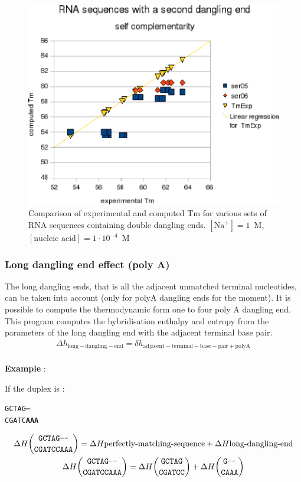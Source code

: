 \documentclass{article}
\begin{document}
\begin{figure}[h]
\includegraphics{images/RNASecondDanglingEnd.eps}
\caption{Comparison of experimental and computed Tm for various sets of
 RNA sequences containing double dangling ends. $[\mbox{Na}^+] = 1$~M, $[\mbox{nucleic acid}] = 1\cdot{}10^{-4}$~M}
\end{figure}

\subsubsection{Long dangling end effect (poly A)}

The long dangling ends, that is all the adjacent unmatched terminal nucleotides, can be taken into
account (only for polyA dangling ends for the moment). It is possible to compute the thermodynamic 
form one to four poly A dangling end. This program computes the hybridisation enthalpy 
and entropy from the parameters of the long dangling end with the adjacent terminal base pair.  
\begin{multline*}
\Delta{}h_\mathrm{long-dangling-end} =
\delta{}h_\mathrm{adjacent-terminal-base-pair+polyA} \\ 
\end{multline*}

\textbf{Example} :

If the duplex is :
\begin{alltt}
GCTAG\textbf{---}
CGATC\textbf{AAA}
\end{alltt}
\begin{multline*}
\Delta H {\mbox{\texttt{GCTAG---}} \choose \mbox{\texttt{CGATCCAAA}}} =
\Delta H {\mbox{perfectly-matching-sequence}} +
\Delta H {\mbox{long-dangling-end}} \\
\Delta H {\mbox{\texttt{GCTAG---}} \choose \mbox{\texttt{CGATCCAAA}}} =
\Delta H {\mbox{\texttt{GCTAG}} \choose \mbox{\texttt{CGATCC}}} +
\Delta H {\mbox{\texttt{G---}} \choose \mbox{\texttt{CAAA}}} \\
\end{multline*}
\end{document}
